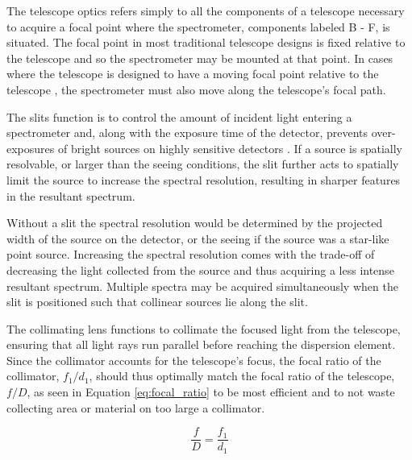 The telescope optics refers simply to all the components of a telescope necessary to acquire a focal point where the spectrometer, components labeled B - F, is situated. The focal point in most traditional telescope designs is fixed relative to the telescope and so the spectrometer may be mounted at that point. In cases where the telescope is designed to have a moving focal point relative to the telescope \cite[see][]{Arecibo, HET, SALT_design}, the spectrometer must also move along the telescope's focal path.
\prgph
\prgph

The slits function is to control the amount of incident light entering a spectrometer and, along with the exposure time of the detector, prevents over-exposures of bright sources on highly sensitive detectors \citep{TonkPracAmSpec}. If a source is spatially resolvable, or larger than the seeing conditions, the slit further acts to spatially limit the source to increase the spectral resolution, resulting in sharper features in the resultant spectrum.
\prgph

Without a slit the spectral resolution would be determined by the projected width of the source on the detector, or the seeing if the source was a star-like point source. Increasing the spectral resolution comes with the trade-off of decreasing the light collected from the source and thus acquiring a less intense resultant spectrum. Multiple spectra may be acquired simultaneously when the slit is positioned such that collinear sources lie along the slit.
\prgph

The collimating lens functions to collimate the focused light from the telescope, ensuring that all light rays run parallel before reaching the dispersion element. Since the collimator accounts for the telescope's focus, the focal ratio of the collimator, $f_{1} / d_{1}$, should thus optimally match the focal ratio of the telescope, $f / D$, as seen in Equation \ref{eq:focal_ratio} to be most efficient and to not waste collecting area or material on too large a collimator.

\begin{equation}
	\frac{f}{D} = \frac{f_{1}}{d_{1}}
	\label{eq:focal_ratio}
\end{equation}

